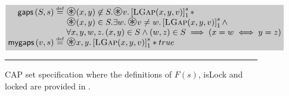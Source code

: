 \begin{figure}
\[\begin{array}{@{} l @{}}
		
		

	
	
	\shade{
	\begin{array}{@{} r @{\hspace*{3pt}} l @{}}
		\gapsCAP{S}{s} \eqdef & \iterStar(x, y) \not\in S. \iterStar v. \capGapC{x}{y}{v}{s} *\\
		& \iterStar (x, y) \in S. \exsts{w} \iterStar v \not= w. \capGapC{x}{y}{v}{s} \land \\
		&\for{x, y, w, z} (x, y) \in S \land (w, z) \in S \implies (x = w \iff y = z) \\
		
	  \myGapsCAP{v}{s} \eqdef & \iterStar x, y. \capGapC{x}{y}{v}{s} * true \\
		
	\end{array}
	}

		

\end{array}
\]
\hrule
\caption{CAP set specification where the definitions of $F(s)$, \textsf{isLock} and \textsf{locked} are provided in \cite{cap-ecoop10}.}
\label{fig:capSetExample}
\end{figure}
